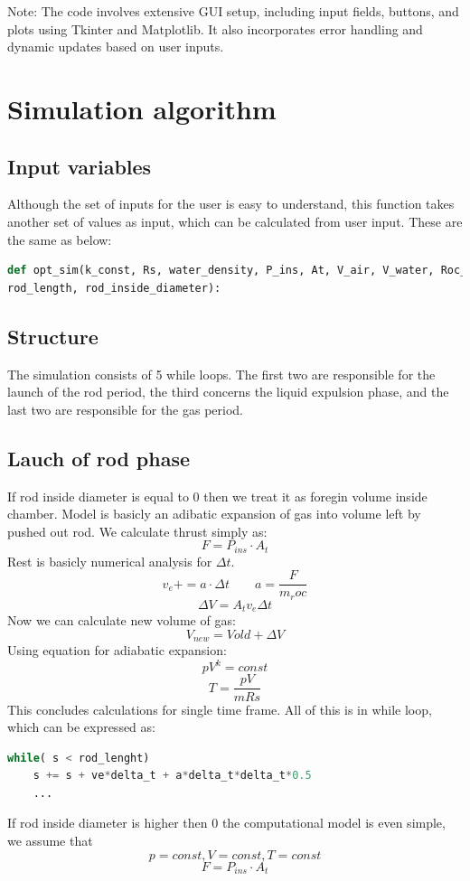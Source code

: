 \documentclass{report}
\begin{document}
Note: The code involves extensive GUI setup, including input fields, buttons, and plots using Tkinter and Matplotlib. It also incorporates error handling and dynamic updates based on user inputs.

\chapter{Simulation algorithm}
\section{Input variables}
Although the set of inputs for the user is easy to understand, this function takes another set of values as input, which can be calculated from user input. These are the same as below:

\begin{lstlisting}[language=Python]
def opt_sim(k_const, Rs, water_density, P_ins, At, V_air, V_water, Roc_mass, T,
rod_length, rod_inside_diameter):
\end{lstlisting}

\section{Structure}
The simulation consists of 5 while loops. The first two are responsible for the launch of the rod period, the third concerns the liquid expulsion phase, and the last two are responsible for the gas period.

\section{Lauch of rod phase}
If rod inside diameter is equal to 0 then we treat it as foregin volume inside chamber. Model is basicly an adibatic expansion of gas into volume left by pushed out rod. We calculate thrust simply as:
$$F = P_{ins} \cdot A_t$$
Rest is basicly numerical analysis for $\Delta t$.
$$v_e += a \cdot \Delta t \qquad a = \frac{F}{m_roc}$$
$$ \Delta V = A_t v_e \Delta t$$
Now we can calculate new volume of gas:
$$ V_{new} = V{old} + \Delta V$$
Using equation for adiabatic expansion:
$$ p V^k = const$$
$$ T = \frac{p V}{m Rs}$$
This concludes calculations for single time frame. All of this is in while loop, which can be expressed as:
\begin{lstlisting}[language=Python]
while( s < rod_lenght)
	s += s + ve*delta_t + a*delta_t*delta_t*0.5
	...
\end{lstlisting}
If rod inside diameter is higher then 0 the computational model is even simple, we assume that $$p=const, V=const, T=const$$
$$F=P_{ins}\cdot A_t$$
\end{document}
